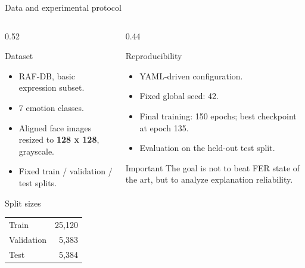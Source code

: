 \documentclass[aspectratio=169,10pt]{beamer}
\begin{document}
\begin{frame}{Data and experimental protocol}
  \begin{columns}[T,totalwidth=\textwidth]
    \begin{column}{0.52\textwidth}
      \begin{block}{Dataset}
        \begin{itemize}
          \item RAF-DB, basic expression subset.
          \item 7 emotion classes.
          \item Aligned face images resized to \textbf{128 x 128}, grayscale.
          \item Fixed train / validation / test splits.
        \end{itemize}
      \end{block}
      \begin{block}{Split sizes}
        \centering
        \begin{tabular}{l r}
          \toprule
          Train & 25,120 \\
          Validation & 5,383 \\
          Test & 5,384 \\
          \bottomrule
        \end{tabular}
      \end{block}
    \end{column}
    \begin{column}{0.44\textwidth}
      \begin{block}{Reproducibility}
        \begin{itemize}
          \item YAML-driven configuration.
          \item Fixed global seed: 42.
          \item Final training: 150 epochs; best checkpoint at epoch 135.
          \item Evaluation on the held-out test split.
        \end{itemize}
      \end{block}
      \begin{alertblock}{Important}
        The goal is not to beat FER state of the art, but to analyze explanation reliability.
      \end{alertblock}
    \end{column}
  \end{columns}
\end{frame}
\end{document}
